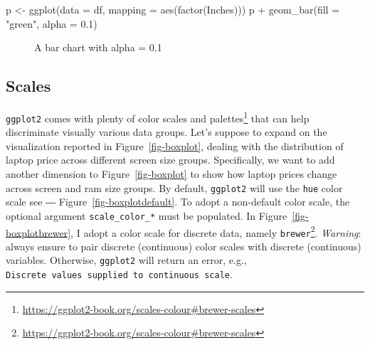 \documentclass[
  letterpaper,
]{article}
\newenvironment{Shaded}{\begin{snugshade}}{\end{snugshade}}
\newcommand{\AttributeTok}[1]{\textcolor[rgb]{0.40,0.45,0.13}{#1}}
\newcommand{\FloatTok}[1]{\textcolor[rgb]{0.68,0.00,0.00}{#1}}
\newcommand{\FunctionTok}[1]{\textcolor[rgb]{0.28,0.35,0.67}{#1}}
\newcommand{\NormalTok}[1]{\textcolor[rgb]{0.00,0.23,0.31}{#1}}
\newcommand{\OtherTok}[1]{\textcolor[rgb]{0.00,0.23,0.31}{#1}}
\newcommand{\SpecialCharTok}[1]{\textcolor[rgb]{0.37,0.37,0.37}{#1}}
\newcommand{\StringTok}[1]{\textcolor[rgb]{0.13,0.47,0.30}{#1}}
\DeclareRobustCommand{\href}[2]{#2\footnote{\url{#1}}}
\begin{document}
\begin{Shaded}
\begin{Highlighting}[]
\NormalTok{p }\OtherTok{\textless{}{-}} \FunctionTok{ggplot}\NormalTok{(}\AttributeTok{data =}\NormalTok{ df, }\AttributeTok{mapping =} \FunctionTok{aes}\NormalTok{(}\FunctionTok{factor}\NormalTok{(Inches)))}
\NormalTok{p }\SpecialCharTok{+} \FunctionTok{geom\_bar}\NormalTok{(}\AttributeTok{fill =} \StringTok{"green"}\NormalTok{, }\AttributeTok{alpha =} \FloatTok{0.1}\NormalTok{)}
\end{Highlighting}
\end{Shaded}

\begin{figure}[H]


\caption{\label{fig-alphaagg}A bar chart with alpha = 0.1}

\end{figure}%

\subsection{Scales}\label{scales}

\texttt{ggplot2} comes with plenty of
\href{https://ggplot2-book.org/scales-colour\#brewer-scales}{color
scales and palettes} that can help discriminate visually various data
groups. Let's suppose to expand on the visualization reported in
Figure~\ref{fig-boxplot}, dealing with the distribution of laptop price
across different screen size groups. Specifically, we want to add
another dimension to Figure~\ref{fig-boxplot} to show how laptop prices
change across screen and ram size groups. By default, \texttt{ggplot2}
will use the \texttt{hue} color scale see ―
Figure~\ref{fig-boxplotdefault}. To adopt a non-default color scale, the
optional argument \texttt{scale\_color\_*} must be populated. In
Figure~\ref{fig-boxplotbrewer}, I adopt a color scale for discrete data,
namely
\href{https://ggplot2-book.org/scales-colour\#brewer-scales}{\texttt{brewer}}.
\emph{Warning}: always ensure to pair discrete (continuous) color scales
with discrete (continuous) variables. Otherwise, \texttt{ggplot2} will
return an error, e.g.,
\texttt{Discrete\ values\ supplied\ to\ continuous\ scale}.
\end{document}
